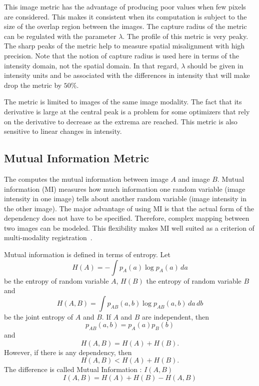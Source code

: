This image metric has the advantage of producing poor values when few pixels
are considered.  This makes it consistent when its computation is subject to
the size of the overlap region between the images. The capture radius of the
metric can be regulated with the parameter $\lambda$.  The profile of this
metric is very peaky. The sharp peaks of the metric help to measure spatial
misalignment with high precision. Note that the notion of capture radius is
used here in terms of the intensity domain, not the spatial domain. In that
regard, $\lambda$ should be given in intensity units and be associated with
the differences in intensity that will make drop the metric by $50\%$.

The metric is limited to images of the same image modality.  The
fact that its derivative is large at the central peak is a problem for some
optimizers that rely on the derivative to decrease as the extrema are
reached.  This metric is also sensitive to linear changes in intensity.


\subsection{Mutual Information Metric}
\label{sec:MutualInformationMetric}

The  computes the mutual
information between image $A$ and image $B$.  Mutual information (MI)
measures how much information one random variable (image intensity in one
image) tells about another random variable (image intensity in the other
image). The major advantage of using MI is that the actual form of the
dependency does not have to be specified.  Therefore, complex mapping between
two images can be modeled.  This flexibility makes MI well suited as a
criterion of multi-modality registration~\cite{Pluim2003}.

Mutual information is defined in terms of entropy. Let
\begin{equation}
H(A) = - \int p_A(a) \log p_A(a)\, da
\end{equation}
be the entropy of random variable $A$, $H(B)$ the entropy of 
random variable $B$ and 
\begin{equation}
H(A,B) = \int p_{AB}(a,b) \log p_{AB}(a,b)\,da\,db
\end{equation}
be the joint entropy of $A$ and $B$. If $A$ and $B$ are independent, then
\begin{equation}
p_{AB}(a,b) = p_A(a) p_B(b)
\end{equation}
and
\begin{equation}
H(A,B) = H(A) + H(B).
\end{equation}
However, if there is any dependency, then
\begin{equation}
H(A,B)<H(A)+H(B).
\end{equation}
The difference is called Mutual Information : \( I(A,B) \)
\begin{equation}
I(A,B)=H(A)+H(B)-H(A,B)
\end{equation}

